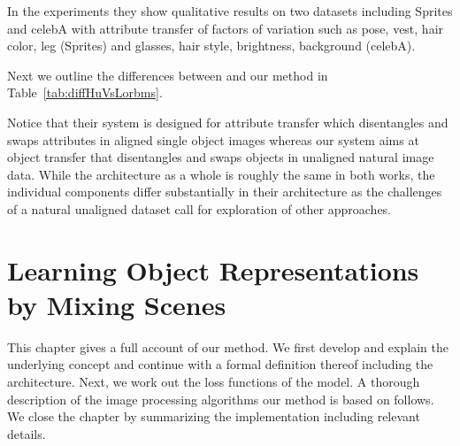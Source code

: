 \documentclass[a4paper,12pt]{report}
\begin{document}
In the experiments they show qualitative results on two datasets including Sprites and celebA with attribute transfer of factors of variation such as pose, vest, hair color, leg (Sprites) and glasses, hair style, brightness, background (celebA).

Next we outline the differences between \cite{DisentFacOfVarByMixTh} and our method in Table~\ref{tab:diffHuVsLorbms}.
\begin{table} [H]
\centering
{}
\caption{Differences between \cite{DisentFacOfVarByMixTh} and our method.} \label{tab:diffHuVsLorbms}
\end{table}
Notice that their system is designed for attribute transfer which disentangles and swaps attributes in aligned single object images whereas our system aims at object transfer that disentangles and swaps objects in unaligned natural image data. While the architecture as a whole is roughly the same in both works, the individual components differ substantially in their architecture as the challenges of a natural unaligned dataset call for exploration of other approaches.


%
\chapter{Learning Object Representations by Mixing Scenes}\label{sec:lorbms_method}
This chapter gives a full account of our method. We first develop and explain the underlying concept and continue with a formal definition thereof including the architecture. Next, we work out the loss functions of the model. A thorough description of the image processing algorithms our method is based on follows. We close the chapter by summarizing the implementation including relevant details. 
\end{document}
